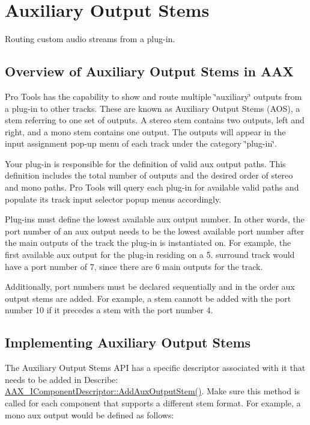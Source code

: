 \hypertarget{a00339}{}\section{Auxiliary Output Stems}
\label{a00339}
Routing custom audio streams from a plug-\/in. 

\hypertarget{a00339_additionalFeatures_AOS_overview}{}\subsection{Overview of Auxiliary Output Stems in A\+A\+X}\label{a00339_additionalFeatures_AOS_overview}
Pro Tools has the capability to show and route multiple \char`\"{}auxiliary\char`\"{} outputs from a plug-\/in to other tracks. These are known as Auxiliary Output Stems (A\+O\+S), a stem referring to one set of outputs. A stereo stem contains two outputs, left and right, and a mono stem contains one output. The outputs will appear in the input assignment pop-\/up menu of each track under the category \char`\"{}plug-\/in\char`\"{}.

Your plug-\/in is responsible for the definition of valid aux output paths. This definition includes the total number of outputs and the desired order of stereo and mono paths. Pro Tools will query each plug-\/in for available valid paths and populate its track input selector popup menus accordingly.

Plug-\/ins must define the lowest available aux output number. In other words, the port number of an aux output needs to be the lowest available port number after the main outputs of the track the plug-\/in is instantiated on. For example, the first available aux output for the plug-\/in residing on a 5. surround track would have a port number of 7, since there are 6 main outputs for the track.

Additionally, port numbers must be declared sequentially and in the order aux output stems are added. For example, a stem cannott be added with the port number 10 if it precedes a stem with the port number 4.\hypertarget{a00339_additionalFeatures_AOS_adding}{}\subsection{Implementing Auxiliary Output Stems}\label{a00339_additionalFeatures_AOS_adding}
The Auxiliary Output Stems A\+P\+I has a specific descriptor associated with it that needs to be added in Describe\+: \hyperlink{a00088_a76266e8a07ce20cdbe5721172c32a93d}{A\+A\+X\+\_\+\+I\+Component\+Descriptor\+::\+Add\+Aux\+Output\+Stem()}. Make sure this method is called for each component that supports a different stem format. For example, a mono aux output would be defined as follows\+:


